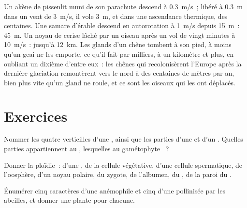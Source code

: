 \begin{example}\label{ex:b2:angiosperm-reproduction:dispersal}
Un akène de pissenlit muni de son parachute descend à \qty{0.3}{m/s}~;
libéré à \qty{0.3}{m} dans un vent de \qty{3}{m/s}, il vole \qty{3}{m},
et dans une ascendance thermique, des centaines. Une samare d'érable
descend en autorotation à \qty{1}{m/s} depuis \qty{15}{m}~:
\qty{45}{m}. Un noyau de cerise lâché par un oiseau après un vol de
vingt minutes à \qty{10}{m/s}~: jusqu'à \qty{12}{km}. Les glands d'un
chêne tombent à son pied, à moins qu'un geai ne les emporte, ce qu'il
fait par milliers, à un kilomètre et plus, en oubliant un dixième
d'entre eux~: les chênes qui recolonisèrent l'Europe après la dernière
glaciation remontèrent vers le nord à des centaines de mètres par an,
bien plus vite qu'un gland ne roule, et ce sont les oiseaux qui les ont
déplacés.
\end{example}

\section{Exercices}

\begin{exercise}[$\star$]\label{exo:b2:angiosperm-reproduction:1}
Nommer les quatre verticilles d'une , ainsi que les parties d'une
 et d'un . Quelles parties appartiennent au 
, lesquelles au gamétophyte ~?
\end{exercise}

\begin{exercise}[$\star$]\label{exo:b2:angiosperm-reproduction:2}
Donner la ploïdie~: d'une , de la cellule végétative, d'une
cellule spermatique, de l'oosphère, d'un noyau polaire, du zygote, de
l'albumen, du , de la paroi du .
\end{exercise}

\begin{exercise}[$\star$]\label{exo:b2:angiosperm-reproduction:3}
Énumérer cinq caractères d'une  anémophile et cinq d'une 
pollinisée par les abeilles, et donner une plante pour chacune.
\end{exercise}

